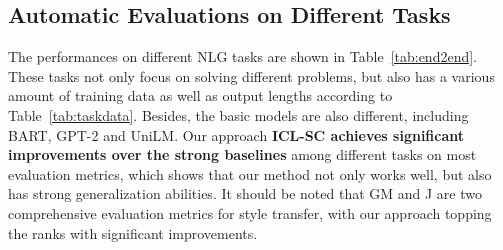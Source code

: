  
\subsection{Automatic Evaluations on Different Tasks}
\label{sec:taskperformances}

The performances on different NLG tasks are shown in Table~\ref{tab:end2end}. 
These tasks not only focus on solving different problems, but also has a various amount of training data as well
as output lengths according to
Table~\ref{tab:taskdata}.
Besides, the basic models are also different, including BART, GPT-2 and UniLM. 
Our approach \textbf{ICL-SC achieves significant improvements over the strong baselines} among different tasks on most evaluation metrics, which shows that our method not only works well, but also has strong generalization abilities.
It should be noted that GM and J are two comprehensive evaluation metrics for style transfer, with our approach topping the ranks with significant improvements.


